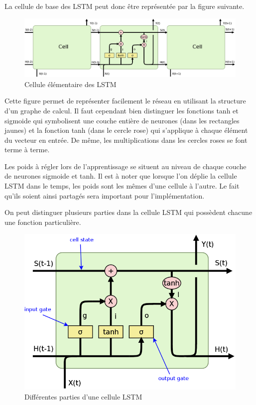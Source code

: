 \documentclass{report}
\theoremstyle{plain}
\theoremstyle{definition}
\theoremstyle{remark}
\begin{document}
La cellule de base des LSTM peut donc être représentée par la figure suivante.

\begin{figure}[h!]
\begin{center}
\includegraphics[scale=0.12]{images/LSTM_article_plusieurscell.png}
\caption{Cellule élémentaire des LSTM}
\label{cellule LSTM}
\end{center}
\end{figure}

Cette figure permet de représenter facilement le réseau en utilisant la structure d'un graphe de calcul. Il faut cependant bien distinguer les fonctions tanh et sigmoide qui symbolisent une couche entière de neurones (dans les rectangles jaunes) et la fonction tanh (dans le cercle rose) qui s'applique à chaque élément du vecteur en entrée. De même, les multiplications dans les cercles roses se font terme à terme.

Les poids à régler lors de l'apprentissage se situent au niveau de chaque couche de neurones sigmoide et tanh. Il est à noter que lorsque l'on déplie la cellule LSTM dans le temps, les poids sont les mêmes d'une cellule à l'autre. Le fait qu'ils soient ainsi partagés sera important pour l'implémentation.

On peut distinguer plusieurs parties dans la cellule LSTM qui possèdent chacune une fonction particulière.

\begin{figure}[h!]
\begin{center}
\includegraphics[scale=0.2]{images/LSTM_article_gates.png}
\caption{Différentes parties d'une cellule LSTM}
\label{cellule LSTM gates}
\end{center}
\end{figure}
\end{document}
